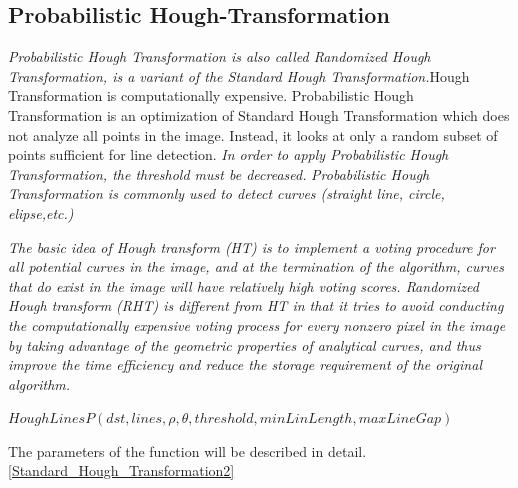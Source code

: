 %
\subsection{Probabilistic Hough-Transformation}\label{sec:Probabilistic Hough-Transformation}
%

\emph{\color{blue}Probabilistic Hough Transformation is also called Randomized Hough Transformation, is a variant of the Standard Hough Transformation.}Hough Transformation is computationally expensive. Probabilistic Hough Transformation is an optimization of Standard Hough Transformation which does not analyze all points in the image. Instead, it looks at only a random subset of points sufficient for line detection. \emph{\color{blue}In order to apply Probabilistic Hough Transformation, the threshold must be decreased.} \emph{\color{red}Probabilistic Hough Transformation is commonly used to detect curves (straight line, circle, elipse,etc.) }



\emph{\color{red}The basic idea of Hough transform (HT) is to implement a voting procedure for all potential curves in the image, and at the termination of the algorithm, curves that do exist in the image will have relatively high voting scores. Randomized Hough transform (RHT) is different from HT in that it tries to avoid conducting the computationally expensive voting process for every nonzero pixel in the image by taking advantage of the geometric properties of analytical curves, and thus improve the time efficiency and reduce the storage requirement of the original algorithm.}

  \begin{center}
  
$HoughLinesP(dst, lines, \rho, \theta, threshold, minLinLength, maxLineGap )  $

  \end{center}

The parameters of the function will be described in detail.\ref{Standard_Hough_Transformation2}
 
